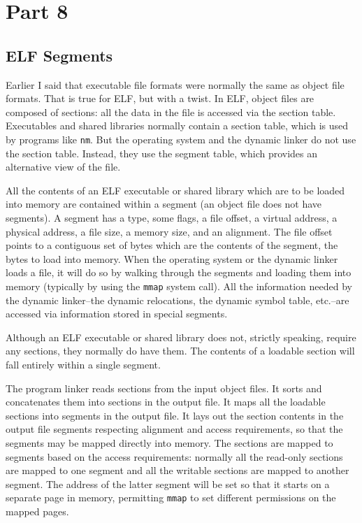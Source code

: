 \section{Part 8}
\subsection{ELF Segments}

Earlier I said that executable file formats were normally the same as object
file formats.  That is true for ELF, but with a twist.  In ELF, object files
are composed of sections: all the data in the file is accessed via the section
table.  Executables and shared libraries normally contain a section table,
which is used by programs like \texttt{nm}.  But the operating system and the
dynamic linker do not use the section table.  Instead, they use the segment
table, which provides an alternative view of the file.

All the contents of an ELF executable or shared library which are to be loaded
into memory are contained within a segment (an object file does not have
segments).  A segment has a type, some flags, a file offset, a virtual address,
a physical address, a file size, a memory size, and an alignment.  The file
offset points to a contiguous set of bytes which are the contents of the
segment, the bytes to load into memory.  When the operating system or the
dynamic linker loads a file, it will do so by walking through the segments and
loading them into memory (typically by using the \texttt{mmap} system call).  All
the information needed by the dynamic linker–the dynamic relocations, the
dynamic symbol table, etc.--are accessed via information stored in special
segments.

Although an ELF executable or shared library does not, strictly speaking,
require any sections, they normally do have them.  The contents of a loadable
section will fall entirely within a single segment.

The program linker reads sections from the input object files.  It sorts and
concatenates them into sections in the output file.  It maps all the loadable
sections into segments in the output file.  It lays out the section contents in
the output file segments respecting alignment and access requirements, so that
the segments may be mapped directly into memory.  The sections are mapped to
segments based on the access requirements: normally all the read-only sections
are mapped to one segment and all the writable sections are mapped to another
segment.  The address of the latter segment will be set so that it starts on a
separate page in memory, permitting \texttt{mmap} to set different permissions on
the mapped pages.

